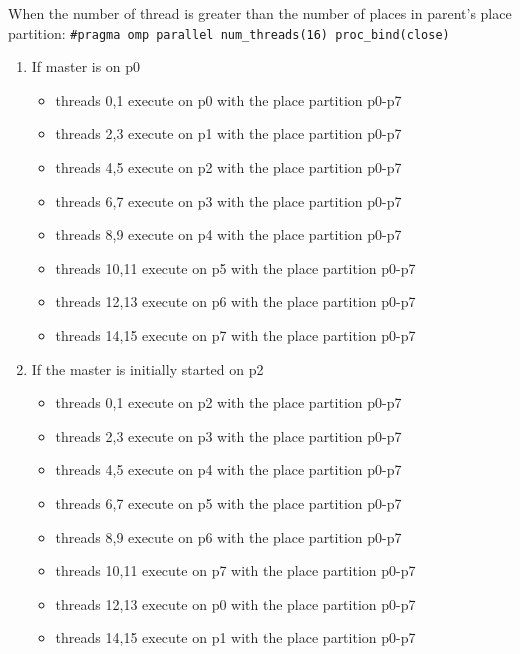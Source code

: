 \documentclass[11pt]{article}
\begin{document}
\begin{enumerate}
When the number of thread is greater than the number of places in parent's place partition:
\texttt{\#pragma omp parallel num\_threads(16) proc\_bind(close)}
\begin{enumerate}
\item If master is on p0
\begin{itemize}
\item threads 0,1 execute on p0 with the place partition p0-p7
\item threads 2,3 execute on p1 with the place partition p0-p7
\item threads 4,5 execute on p2 with the place partition p0-p7
\item threads 6,7 execute on p3 with the place partition p0-p7
\item threads 8,9 execute on p4 with the place partition p0-p7
\item threads 10,11 execute on p5 with the place partition p0-p7
\item threads 12,13 execute on p6 with the place partition p0-p7
\item threads 14,15 execute on p7 with the place partition p0-p7
\end{itemize}
\item If the master is initially started on p2
\begin{itemize}
\item threads 0,1 execute on p2 with the place partition p0-p7
\item threads 2,3 execute on p3 with the place partition p0-p7
\item threads 4,5 execute on p4 with the place partition p0-p7
\item threads 6,7 execute on p5 with the place partition p0-p7
\item threads 8,9 execute on p6 with the place partition p0-p7
\item threads 10,11 execute on p7 with the place partition p0-p7
\item threads 12,13 execute on p0 with the place partition p0-p7
\item threads 14,15 execute on p1 with the place partition p0-p7
\end{itemize}
\end{enumerate}


\end{enumerate}
\end{document}

